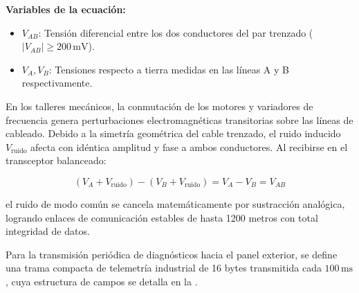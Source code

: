 \noindent\textbf{Variables de la ecuación:}
\begin{itemize}
    \item $V_{AB}$: Tensión diferencial entre los dos conductores del par trenzado ($|V_{AB}| \ge 200\,\text{mV}$).
    \item $V_A, V_B$: Tensiones respecto a tierra medidas en las líneas A y B respectivamente.
\end{itemize}

En los talleres mecánicos, la conmutación de los motores y variadores de frecuencia genera perturbaciones electromagnéticas transitorias sobre las líneas de cableado. Debido a la simetría geométrica del cable trenzado, el ruido inducido $V_{\text{ruido}}$ afecta con idéntica amplitud y fase a ambos conductores. Al recibirse en el transceptor balanceado:

\begin{equation}
(V_A + V_{\text{ruido}}) - (V_B + V_{\text{ruido}}) = V_A - V_B = V_{AB}
\label{eq:cancelacion_ruido}
\end{equation}

el ruido de modo común se cancela matemáticamente por sustracción analógica, logrando enlaces de comunicación estables de hasta 1200 metros con total integridad de datos.

Para la transmisión periódica de diagnósticos hacia el panel exterior, se define una trama compacta de telemetría industrial de 16 bytes transmitida cada $100\,\text{ms}$, cuya estructura de campos se detalla en la .

